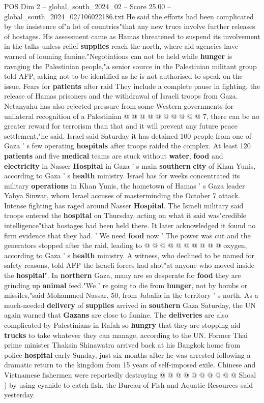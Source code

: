 \begin{textsample}{POS Dim 2 – global\_south\_2024\_02 – Score 25.00 – global\_south\_2024\_02/106022186.txt}
He said the efforts had been complicated by the insistence of"a lot of countries"that any new truce involve further releases of hostages.
His assessment came as Hamas threatened to suspend its involvement in the talks unless relief \textbf{supplies} reach the north, where aid agencies have warned of looming famine."Negotiations can not be held while \textbf{hunger} is ravaging the Palestinian people,"a senior source in the Palestinian militant group told AFP, asking not to be identified as he is not authorised to speak on the issue.
Fears for \textbf{patients} after raid They include a complete pause in fighting, the release of Hamas prisoners and the withdrawal of Israeli troops from Gaza.
Netanyahu has also rejected pressure from some Western governments for unilateral recognition of a Palestinian @ @ @ @ @ @ @ @ @ @ 7, there can be no greater reward for terrorism than that and it will prevent any future peace settlement,"he said.
Israel said Saturday it has detained 100 people from one of Gaza ' s few operating \textbf{hospitals} after troops raided the complex.
At least 120 \textbf{patients} and five \textbf{medical} teams are stuck without \textbf{water}, \textbf{food} and \textbf{electricity} in Nasser \textbf{Hospital} in Gaza ' s main \textbf{southern} \textbf{city} of Khan Yunis, according to Gaza ' s \textbf{health} ministry.
Israel has for weeks concentrated its military \textbf{operations} in Khan Yunis, the hometown of Hamas ' s Gaza leader Yahya Sinwar, whom Israel accuses of masterminding the October 7 attack.
Intense fighting has raged around Nasser \textbf{Hospital}.
The Israeli military said troops entered the \textbf{hospital} on Thursday, acting on what it said was"credible intelligence"that hostages had been held there.
It later acknowledged it found no firm evidence that they had. ' We need \textbf{food} now ' The power was cut and the generators stopped after the raid, leading to @ @ @ @ @ @ @ @ @ @ oxygen, according to Gaza ' s \textbf{health} ministry.
A witness, who declined to be named for safety reasons, told AFP the Israeli forces had shot"at anyone who moved inside the \textbf{hospital}".
In \textbf{northern} Gaza, many are so desperate for \textbf{food} they are grinding up \textbf{animal} feed."We ' re going to die from \textbf{hunger}, not by bombs or missiles,"said Mohammed Nassar, 50, from Jabalia in the territory ' s north.
As a much-needed \textbf{delivery} of \textbf{supplies} arrived in \textbf{southern} Gaza Saturday, the UN again warned that \textbf{Gazans} are close to famine.
The \textbf{deliveries} are also complicated by Palestinians in Rafah so \textbf{hungry} that they are stopping aid \textbf{trucks} to take whatever they can manage, according to the UN.
Former Thai prime minister Thaksin Shinawatra arrived back at his Bangkok home from police \textbf{hospital} early Sunday, just six months after he was arrested following a dramatic return to the kingdom from 15 years of self-imposed exile.
Chinese and Vietnamese fishermen were reportedly destroying @ @ @ @ @ @ @ @ @ @ Shoal ) by using cyanide to catch fish, the Bureau of Fish and Aquatic Resources said yesterday.


\end{textsample}

